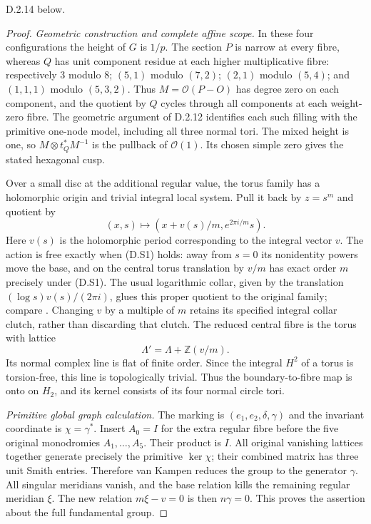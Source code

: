 D.2.14 below.
\begin{proof}
\emph{Geometric construction and complete affine scope.}
In these four configurations the height of $G$ is $1/p$.
The section $P$ is narrow at every fibre, whereas $Q$ has
unit component residue at each higher multiplicative fibre:
respectively $3$ modulo $8$; $(5,1)$ modulo $(7,2)$;
$(2,1)$ modulo $(5,4)$; and $(1,1,1)$ modulo $(5,3,2)$.
Thus $M=\mathcal O(P-O)$ has degree zero on each component,
and the quotient by $Q$ cycles through all components at each
weight-zero fibre. The geometric argument of D.2.12 identifies
each such filling with the primitive one-node model, including
all three normal tori. The mixed height is one, so
$M\otimes t_Q^*M^{-1}$ is the pullback of $\mathcal O(1)$.
Its chosen simple zero gives the stated hexagonal cusp.

Over a small disc at the additional regular value, the torus
family has a holomorphic origin and trivial integral local
system. Pull it back by $z=s^m$ and quotient by
\[
 (x,s)\longmapsto (x+v(s)/m,e^{2\pi i/m}s).
\]
Here $v(s)$ is the holomorphic period corresponding to the
integral vector $v$. The action is free exactly when (D.S1)
holds: away from $s=0$ its nonidentity powers move the base,
and on the central torus translation by $v/m$ has exact
order $m$ precisely under (D.S1). The usual logarithmic
collar, given by the translation
$(\log s)v(s)/(2\pi i)$, glues this proper quotient to the
original family; compare \cite[Proposition 2.3]{manViaclovskyLogs26}.
Changing $v$ by a multiple of $m$ retains its specified
integral collar clutch, rather than discarding that clutch.
The reduced central fibre is the torus with lattice
\[
 \Lambda'=\Lambda+\mathbb Z(v/m).
 \tag{D.S5}
\]
Its normal complex line is flat of finite order. Since the
integral $H^2$ of a torus is torsion-free, this line is
topologically trivial. Thus the boundary-to-fibre map is
onto on $H_2$, and its kernel consists of its four normal
circle tori.

\emph{Primitive global graph calculation.}
The marking is $(e_1,e_2,\delta,\gamma)$ and the invariant
coordinate is $\chi=\gamma^*$. Insert $A_0=I$ for the extra
regular fibre before the five original monodromies
$A_1,\ldots,A_5$. Their product is $I$.
All original vanishing lattices together generate precisely
the primitive $\ker\chi$; their combined matrix has three
unit Smith entries. Therefore van Kampen reduces the group
to the generator $\gamma$. All singular meridians vanish,
and the base relation kills the remaining regular meridian
$\xi$. The new relation $m\xi-v=0$ is then $n\gamma=0$.
This proves the assertion about the full fundamental group.


\end{proof}
